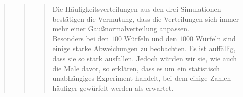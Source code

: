 \begin{quote}
\begin{quote}
\begin{quote}
                Die Häufigkeitsverteilungen aus den drei Simulationen bestätigen die Vermutung, dass die Verteilungen
                sich immer mehr einer Gaußnormalverteilung anpassen.\\
                Besonders bei den $100$ Würfeln und den $1000$ Würfeln sind einige starke Abweichungen zu beobachten. Es
                ist auffällig, dass sie so stark ausfallen. Jedoch würden wir sie, wie auch die Male davor, so erklären,
                dass es um ein statistisch unabhängiges Experiment handelt, bei
                dem einige Zahlen häufiger gewürfelt werden als erwartet.
		\end{quote}
    \end{quote}
\end{quote}

